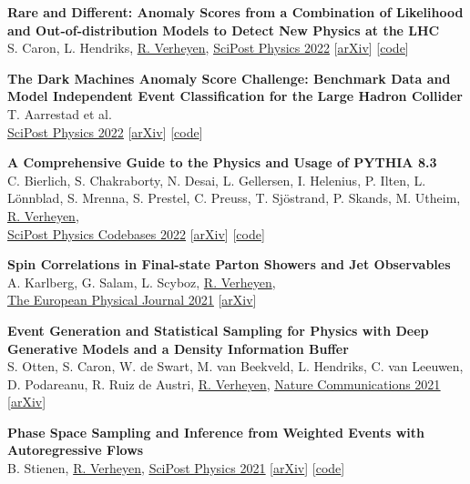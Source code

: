 \documentclass[a4paper,12pt]{article}
\begin{document}
\textbf{Rare and Different: Anomaly Scores from a Combination of Likelihood and Out-of-distribution Models to Detect New Physics at the LHC} \\
S. Caron, L. Hendriks, \underline{R. Verheyen},
\href{https://scipost.org/10.21468/SciPostPhys.12.1.043}{\underline{SciPost Physics 2022}} [\href{https://arxiv.org/pdf/2105.14027.pdf}{arXiv}] [\href{https://github.com/bostdiek/DarkMachines-UnsupervisedChallenge}{code}]

\textbf{The Dark Machines Anomaly Score Challenge: Benchmark Data and Model Independent Event Classification for the Large Hadron Collider} \\
T. Aarrestad et al. \\
\href{https://scipost.org/10.21468/SciPostPhys.12.1.043}{\underline{SciPost Physics 2022}} [\href{https://arxiv.org/pdf/2105.14027.pdf}{arXiv}] [\href{https://github.com/bostdiek/DarkMachines-UnsupervisedChallenge}{code}]

\textbf{A Comprehensive Guide to the Physics and Usage of PYTHIA 8.3} \\
C. Bierlich, S. Chakraborty, N. Desai, L. Gellersen, I. Helenius, P. Ilten, L. Lönnblad, S. Mrenna, S. Prestel, C. Preuss, T. Sjöstrand, P. Skands, M. Utheim, \underline{R. Verheyen}, \\
\href{https://scipost.org/SciPostPhysCodeb.8-r8.3}{\underline{SciPost Physics Codebases 2022}} [\href{https://arxiv.org/abs/2203.11601}{arXiv}] [\href{https://pythia.org}{code}]

\textbf{Spin Correlations in Final-state Parton Showers and Jet Observables} \\
A. Karlberg, G. Salam, L. Scyboz, \underline{R. Verheyen}, \\
\href{https://link.springer.com/article/10.1140/epjc/s10052-021-09378-0}{\underline{The European Physical Journal 2021}} [\href{https://arxiv.org/pdf/2103.16526.pdf}{arXiv}]

\textbf{Event Generation and Statistical Sampling for Physics with Deep Generative Models and a Density Information Buffer} \\
S. Otten, S. Caron, W. de Swart, M. van Beekveld, L. Hendriks, C. van Leeuwen, D. Podareanu, R. Ruiz de Austri, \underline{R. Verheyen}, 
\href{https://www.nature.com/articles/s41467-021-22616-z}{\underline{Nature Communications 2021}} [\href{https://arxiv.org/abs/1901.00875}{arXiv}]

\textbf{Phase Space Sampling and Inference from Weighted Events with Autoregressive Flows} \\
B. Stienen, \underline{R. Verheyen}, 
\href{https://scipost.org/10.21468/SciPostPhys.10.2.038}{\underline{SciPost Physics 2021}} [\href{https://arxiv.org/pdf/2011.13445.pdf}{arXiv}] [\href{https://github.com/rbvh/PhaseSpaceAutoregressiveFlow}{code}]
\end{document}
